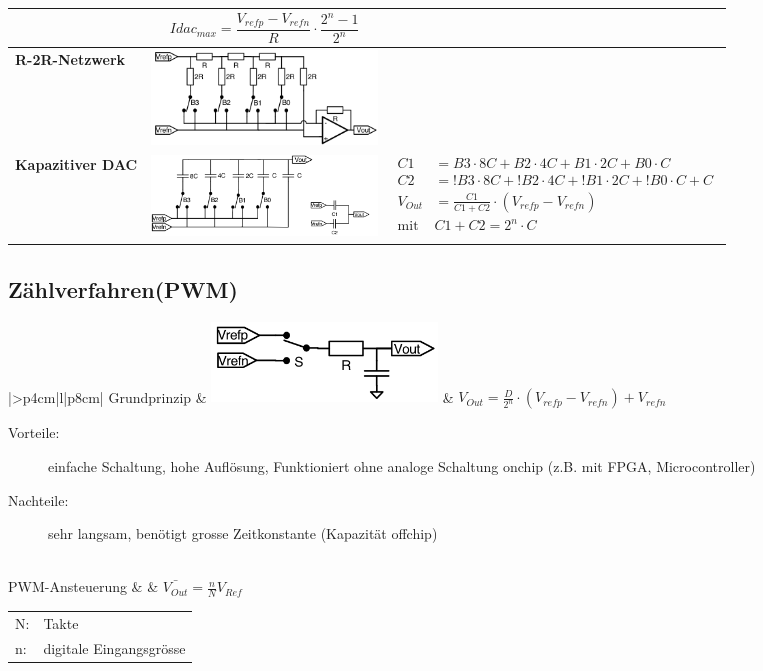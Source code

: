 \begin{longtable}{|>{\bfseries}p{3cm}|c|p{8.6cm}|}
	& \[
		Idac_{max}=\frac{V_{refp}-V_{refn}}{R} \cdot \frac{2^n-1}{2^n}
	  \]
	\\ \hline
	R-2R-Netzwerk \hartl{462}
	& \includegraphics[width=6cm, valign=t]{./pictures/r2rnetzwerk.png}
	&
	\\ \hline
	Kapazitiver DAC
	& \includegraphics[width=6cm, valign=t]{./pictures/kapazitiverDAC.png}
	& {\begin{align*}
		C1	&= B3 \cdot 8C+B2 \cdot 4C+ B1 \cdot 2C+B0 \cdot C \\
		C2	&= !B3 \cdot 8C+!B2 \cdot 4C+ !B1 \cdot 2C+!B0 \cdot C+C \\
		V_{Out}& =\frac{C1}{C1+C2}\cdot (V_{refp}-V_{refn})\\
		\text{mit } & C1+C2=2^n\cdot C
	  \end{align*}}
	\\ \hline
\end{longtable}


\subsection{Zählverfahren(PWM)}
\begin{longtable}{|>{\bfseries}p{4cm}|l|p{8cm}|}
	\hline 
	Grundprinzip \hartl{466}
	& \includegraphics[width=6cm, valign=t]{./pictures/pwm_DAC.png}
	& $V_{Out}=\frac{D}{2^n} \cdot (V_{refp}-V_{refn})+V_{refn}$	  
	  \begin{description}
  		\item[Vorteile:] einfache Schaltung, hohe Auflösung, Funktioniert ohne analoge Schaltung onchip (z.B. mit FPGA, Microcontroller) 
  		\item[Nachteile:] sehr langsam, benötigt grosse Zeitkonstante (Kapazität offchip)
	  \end{description}
	\\ \hline
	PWM-Ansteuerung \hartl{466}
	& \parbox[c][2cm]{6cm}{}
	& $\bar{V_{Out}}=\frac{n}{N}V_{Ref}$
	  \begin{tabular}{ll}
		N:&Takte\\
		n:&digitale Eingangsgrösse
	  \end{tabular}
	\\ \hline
\end{longtable}


